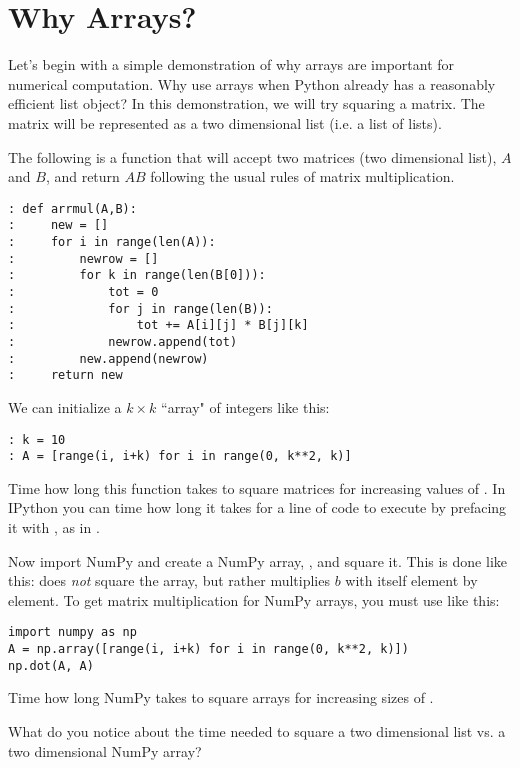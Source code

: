 \label{lab:Essentials_NumPy}

\section*{Why Arrays?}
Let's begin with a simple demonstration of why arrays are important for numerical computation.
Why use arrays when Python already has a reasonably efficient list object?
In this demonstration, we will try squaring a matrix.
The matrix will be represented as a two dimensional list (i.e. a list of lists).

The following is a function that will accept two matrices (two dimensional list), $A$ and $B$, and return $AB$ following the usual rules of matrix multiplication.
\begin{lstlisting}
: def arrmul(A,B):
:     new = []
:     for i in range(len(A)):
:         newrow = []
:         for k in range(len(B[0])):
:             tot = 0
:             for j in range(len(B)):
:                 tot += A[i][j] * B[j][k]
:             newrow.append(tot)
:         new.append(newrow)
:     return new
\end{lstlisting}
We can initialize a $k \times k$ ``array" of integers like this:
\begin{lstlisting}
: k = 10
: A = [range(i, i+k) for i in range(0, k**2, k)]
\end{lstlisting}

\begin{problem}
Time how long this function takes to square matrices for increasing values of .
In IPython you can time how long it takes for a line of code to execute by prefacing it with , as in .

Now import NumPy and create a NumPy array, , and square it.
This is done like this:
 does \emph{not} square the array, but rather multiplies $b$ with itself element by element.
To get matrix multiplication for NumPy arrays, you must use  like this:
\begin{lstlisting}
import numpy as np
A = np.array([range(i, i+k) for i in range(0, k**2, k)])
np.dot(A, A)
\end{lstlisting}
Time how long NumPy takes to square arrays for increasing sizes of .

What do you notice about the time needed to square a two dimensional list vs. a two dimensional NumPy array?

\end{problem}


